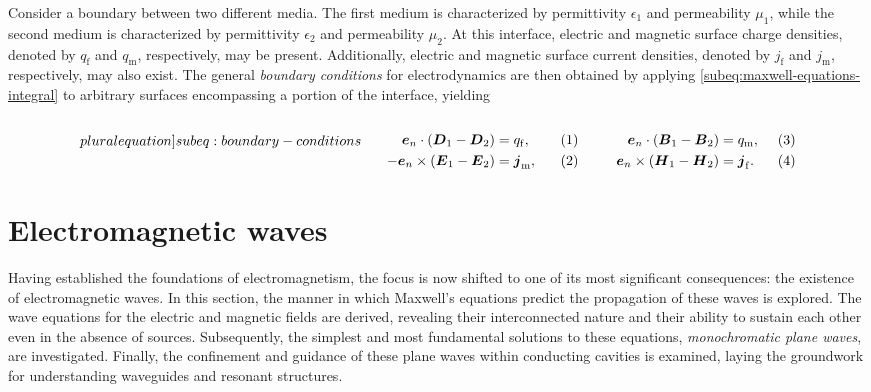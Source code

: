 \documentclass[11pt,a4paper,twoside,openany]{report}
\begin{document}
Consider a boundary between two different media. The first medium is characterized by permittivity $\epsilon_1$ and permeability $\mu_1$, while the second medium is characterized by permittivity $\epsilon_2$ and permeability $\mu_2$. At this interface, electric and magnetic surface charge densities, denoted by $q_{\mathrm f}$ and $q_{\mathrm m}$, respectively, may be present. Additionally, electric and magnetic surface current densities, denoted by $j_{\mathrm f}$ and $j_{\mathrm m}$, respectively, may also exist. The general \emph{boundary conditions} for electrodynamics are then obtained by applying \cref{subeq:maxwell-equations-integral} to arbitrary surfaces encompassing a portion of the interface, yielding\\
\begin{subequations}
    \label[pluralequation]{subeq:boundary-conditions}
    \noindent\centering
    \begin{minipage}{0.45\textwidth}
        \begin{align}
            \label{eq:boundary-conditions-d-normal}
            \vec e_n \cdot (\vec D_1 - \vec D_2) &= q_{\mathrm f},
        \\
            \label{eq:boundary-conditions-e-tangential}
            -\vec e_n \times (\vec E_1 - \vec E_2) &= \vec j_{\mathrm m},
        \end{align}
    \end{minipage}
    \hfill
    \begin{minipage}{0.45\textwidth}
        \begin{align}
            \label{eq:boundary-conditions-b-normal}
            \vec e_n \cdot (\vec B_1 - \vec B_2) &= q_{\mathrm m},
        \\
            \label{eq:boundary-conditions-H-tangential}
            \vec e_n \times (\vec H_1 - \vec H_2) &= \vec j_{\mathrm f}.
        \end{align}
    \end{minipage}
    \bigskip
\end{subequations}

\section{Electromagnetic waves}
\label{sec:electromagnetic-waves}
Having established the foundations of electromagnetism, the focus is now shifted to one of its most significant consequences: the existence of electromagnetic waves. In this section, the manner in which Maxwell's equations predict the propagation of these waves is explored.  The wave equations for the electric and magnetic fields are derived, revealing their interconnected nature and their ability to sustain each other even in the absence of sources. Subsequently, the simplest and most fundamental solutions to these equations, \emph{monochromatic plane waves}, are investigated. Finally, the confinement and guidance of these plane waves within conducting cavities is examined, laying the groundwork for understanding waveguides and resonant structures.
\end{document}
